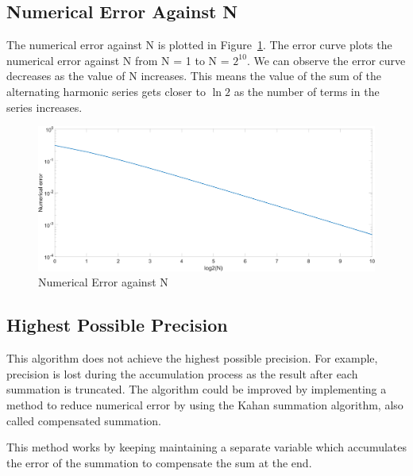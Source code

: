 \subsection[q4c]{Numerical Error Against N}
The numerical error against N is plotted in Figure~\ref*{fig:q4c}. The error curve plots the numerical error against N from N = 1 to N = $2^{10}$. We can observe the error curve decreases as the value of N increases. This means the value of the sum of the alternating harmonic series gets closer to $\ln 2$ as the number of terms in the series increases.
\begin{figure}[htp]
\centering
\caption{Numerical Error against N}\label{fig:q4c}
\includegraphics[width=\textwidth]{q4c.png}
\end{figure}

\subsection[q4d]{Highest Possible Precision}
This algorithm does not achieve the highest possible precision. For example, precision is lost during the accumulation process as the result after each summation is truncated. The algorithm could be improved by implementing a method to reduce numerical error by using the Kahan summation algorithm, also called compensated summation.

This method works by keeping maintaining a separate variable which accumulates the error of the summation to compensate the sum at the end.